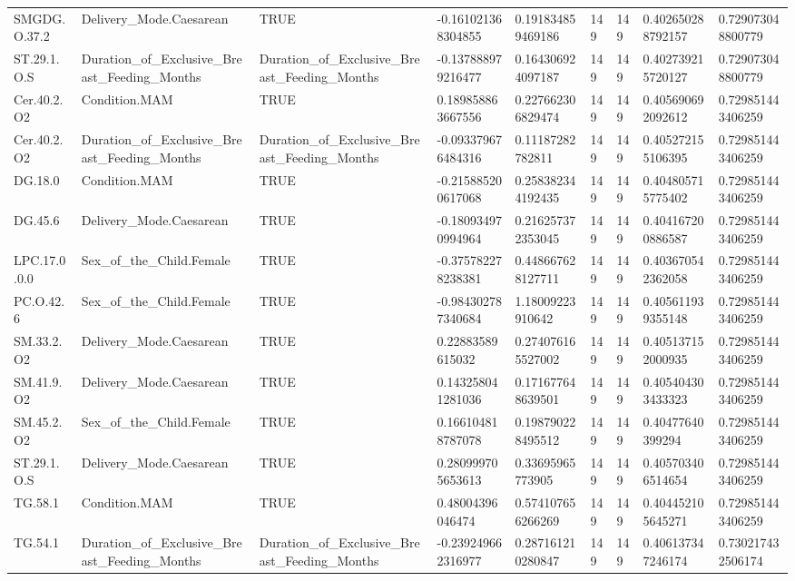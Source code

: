 \begin{longtable}{lllllllll}
SMGDG.O.37.2 & Delivery\_Mode.Caesarean & TRUE & -0.161021368304855 & 0.191834859469186 & 149 & 149 & 0.402650288792157 & 0.729073048800779 \\
ST.29.1.O.S & Duration\_of\_Exclusive\_Breast\_Feeding\_Months & Duration\_of\_Exclusive\_Breast\_Feeding\_Months & -0.137888979216477 & 0.164306924097187 & 149 & 149 & 0.402739215720127 & 0.729073048800779 \\
Cer.40.2.O2 & Condition.MAM & TRUE & 0.189858863667556 & 0.227662306829474 & 149 & 149 & 0.405690692092612 & 0.729851443406259 \\
Cer.40.2.O2 & Duration\_of\_Exclusive\_Breast\_Feeding\_Months & Duration\_of\_Exclusive\_Breast\_Feeding\_Months & -0.093379676484316 & 0.11187282782811 & 149 & 149 & 0.405272155106395 & 0.729851443406259 \\
DG.18.0 & Condition.MAM & TRUE & -0.215885200617068 & 0.258382344192435 & 149 & 149 & 0.404805715775402 & 0.729851443406259 \\
DG.45.6 & Delivery\_Mode.Caesarean & TRUE & -0.180934970994964 & 0.216257372353045 & 149 & 149 & 0.404167200886587 & 0.729851443406259 \\
LPC.17.0.0.0 & Sex\_of\_the\_Child.Female & TRUE & -0.375782278238381 & 0.448667628127711 & 149 & 149 & 0.403670542362058 & 0.729851443406259 \\
PC.O.42.6 & Sex\_of\_the\_Child.Female & TRUE & -0.984302787340684 & 1.18009223910642 & 149 & 149 & 0.405611939355148 & 0.729851443406259 \\
SM.33.2.O2 & Delivery\_Mode.Caesarean & TRUE & 0.22883589615032 & 0.274076165527002 & 149 & 149 & 0.405137152000935 & 0.729851443406259 \\
SM.41.9.O2 & Delivery\_Mode.Caesarean & TRUE & 0.143258041281036 & 0.171677648639501 & 149 & 149 & 0.405404303433323 & 0.729851443406259 \\
SM.45.2.O2 & Sex\_of\_the\_Child.Female & TRUE & 0.166104818787078 & 0.198790228495512 & 149 & 149 & 0.40477640399294 & 0.729851443406259 \\
ST.29.1.O.S & Delivery\_Mode.Caesarean & TRUE & 0.280999705653613 & 0.33695965773905 & 149 & 149 & 0.405703406514654 & 0.729851443406259 \\
TG.58.1 & Condition.MAM & TRUE & 0.48004396046474 & 0.574107656266269 & 149 & 149 & 0.404452105645271 & 0.729851443406259 \\
TG.54.1 & Duration\_of\_Exclusive\_Breast\_Feeding\_Months & Duration\_of\_Exclusive\_Breast\_Feeding\_Months & -0.239249662316977 & 0.287161210280847 & 149 & 149 & 0.406137347246174 & 0.730217432506174 \\

\end{longtable}
